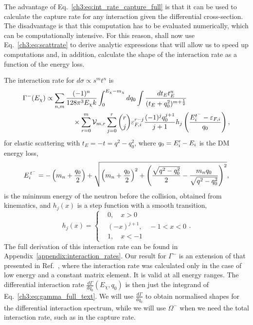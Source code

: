 The advantage of Eq.~\ref{ch3:eq:int_rate_capture_full} is that it can be used to calculate the capture rate for any interaction given the differential cross-section. The disadvantage is that this computation has to be evaluated numerically, which can be computationally intensive. For this reason, shall now use Eq.~\ref{ch3:eq:scattrate} to derive analytic expressions that will allow us to speed up computations and, in addition, calculate the shape of the interaction rate as a function of the energy loss. 

The interaction rate for $d\sigma \propto s^m t^n$ is 
\begin{equation}
    \begin{split}
        \Gamma^{-}(E_\chi) & \propto \sum_{n,m}  \frac{(-1)^n }{128\pi^3 E_\chi k }\int_0^{E_\chi -m_\chi} dq_0\int \frac{dt_E t_E^n}{(t_E + q_0^2)^{m+\frac{1}{2}}}\\
        &\hspace{4em}\times\sum_{r=0}^m \mathcal{V}_{m,r}\sum_{j = 0}^r\binom{r}{j} \varepsilon_{F,i}^{r-j}  \frac{(-1)^{j} q_0^{j+1}}{j+1} h_j\left( \frac{E_i^{t^-} - \varepsilon_{F,i}}{q_0}\right),
    \end{split}
    \label{ch3:eq:gamma_full_text}
\end{equation}
for elastic scattering with $t_E=-t=q^2-q_0^2$, where $q_0=E_i'-E_i$ is the DM energy loss, 
\begin{equation}
E_i^{\, t^{-}} = -\left(m_n+\frac{q_0}{2}\right) + \sqrt{\left(m_n+\frac{q_0}{2}\right)^2+\left(\frac{\sqrt{q^2-q_0^2}}{2}-\frac{m_n q_0}{\sqrt{q^2-q_0^2}}\right)^2}, 
\label{ch3:eq:Etm_def}
\end{equation}
is the minimum energy of the neutron before the collision, obtained from kinematics,  and $h_j(x)$ is a step function with a smooth transition, 
\begin{equation}
    h_j(x) = \begin{cases}
        & 0, \quad x >0\\
        & (-x)^{j+1},\quad -1<x <0\\
        & 1,\quad x<-1
    \end{cases}.
    \label{ch3:eq:h_stepfn}
\end{equation}
The full derivation of this interaction rate can be found in Appendix~\ref{appendix:interaction_rates}. 
Our result for $\Gamma^-$ is an extension of that presented in Ref.~\cite{Bertoni:2013bsa_dec_DarkMatterThermalization}, where the interaction rate was calculated only in the case of low energy and a constant matrix element. It is valid at all energy ranges.
The differential interaction rate $\frac{d\Gamma}{d q_0}(E_\chi,q_0)$ is then just the integrand of Eq.~\ref{ch3:eq:gamma_full_text}.
We will use $\frac{d\Gamma}{d q_0}$ to obtain normalised shapes for the differential interaction spectrum, while we will use $\Omega^-$ when we need the total interaction rate, such as in the capture rate. 


